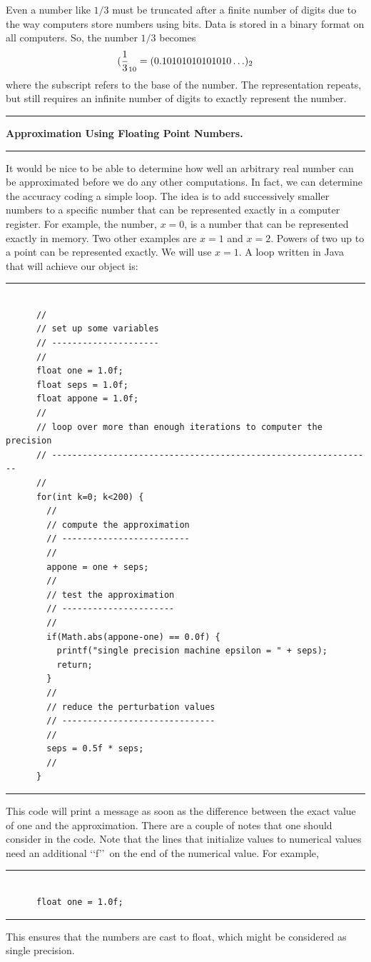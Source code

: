\documentclass[10pt,fleqn]{article}
\begin{document}
Even a number like \(1/3\) must be truncated after a finite number of digits due
to the way computers store numbers using bits. Data is stored in a binary format
on all computers. So, the number \(1/3\) becomes
\[
  ({1\over 3}_{10} = (0.10101010101010\ldots)_2
\]
where the subscript refers to the base of the number. The representation
repeats, but still requires an infinite number of digits to exactly represent
the number.
\vskip0.1in\hrule\vskip0.1in \noindent
{\bf Approximation Using Floating Point Numbers.} 
\vskip0.1in\hrule\vskip0.1in \noindent
It would be nice to be able to determine how well an arbitrary real number can
be approximated before we do any other computations. In fact, we can determine
the accuracy coding a simple loop. The idea is to add successively smaller
numbers to a specific number that can be represented exactly in a computer
register. For example, the number, \(x=0\), is a number that can be represented
exactly in memory. Two other examples are \(x=1\) and \(x=2\). Powers of two up
to a point can be represented exactly. We will use \(x=1\). A loop written in
Java that will achieve our object is:
\vskip0.1in\hrule\vskip0.1in \noindent
\begin{verbatim}

      //
      // set up some variables
      // ---------------------
      //
      float one = 1.0f;
      float seps = 1.0f;
      float appone = 1.0f;
      //
      // loop over more than enough iterations to computer the precision
      // ---------------------------------------------------------------
      //
      for(int k=0; k<200) {
        //
        // compute the approximation
        // -------------------------
        //
        appone = one + seps;
        //
        // test the approximation
        // ----------------------
        //
        if(Math.abs(appone-one) == 0.0f) {
          printf("single precision machine epsilon = " + seps);
          return;
        }
        //
        // reduce the perturbation values
        // ------------------------------
        //
        seps = 0.5f * seps;
        //
      }

\end{verbatim}
\vskip0.1in\hrule\vskip0.1in \noindent
This code will print a message as soon as the difference between the exact value
of one and the approximation. There are a couple of notes that one should 
consider in the code. Note that the lines that initialize values to numerical
values need an additional \lq\lq f\rq\rq\ on the end of the numerical value. For
example,
\vskip0.1in\hrule\vskip0.1in \noindent
\begin{verbatim}

      float one = 1.0f;

\end{verbatim}
\vskip0.1in\hrule\vskip0.1in \noindent
This ensures that the numbers are cast to float, which might be considered as
single precision.
\end{document}
